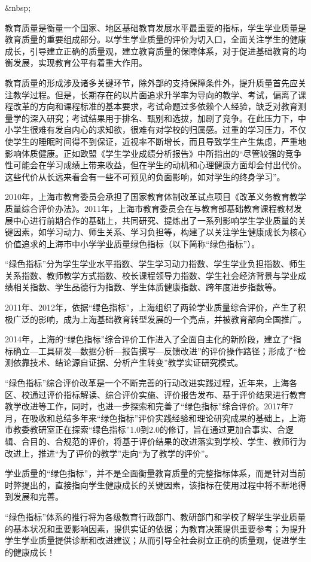 &nbsp;
\vspace{5mm}
\vspace{5mm}

\myprefacetext

教育质量是衡量一个国家、地区基础教育发展水平最重要的指标，学生学业质量是教育质量的重要组成部分。以学生学业质量的评价为切入口，全面关注学生的健康成长，引导建立正确的质量观，建立教育质量的保障体系，对于促进基础教育的均衡发展，实现教育公平有着重大作用。

教育质量的形成涉及诸多关键环节，除外部的支持保障条件外，提升质量首先应关注教学过程。但是，长期存在的以片面追求升学率为导向的教学、考试，偏离了课程改革的方向和课程标准的基本要求，考试命题过多依赖个人经验，缺乏对教育测量学的深入研究；考试结果用于排名、甄别和选拔，加剧了竞争。在此压力下，中小学生很难有发自内心的求知欲，很难有对学校的归属感。过重的学习压力，不仅使学生的睡眠时间得不到保证，近视率不断增长，而且导致学生产生焦虑，严重地影响体质健康。正如欧盟《学生学业成绩分析报告》中所指出的“尽管较强的竞争性可能会在学习成绩上带来收益，但在学生的动机和心理健康方面却会付出代价。这些代价从长远来看会有一些不可预见的负面影响，如对学生的终身学习”。

2010年，上海市教育委员会承担了国家教育体制改革试点项目《改革义务教育教学质量综合评价办法》。2011年，上海市教育委员会在与教育部基础教育课程教材发展中心进行前期合作的基础上，共同研究、提炼出了一系列影响学生学业质量的关键因素，如学习动力、师生关系、学习负担等，构建了以关注学生健康成长为核心价值追求的上海市中小学学业质量绿色指标（以下简称“绿色指标”）。


“绿色指标”分为学生学业水平指数、学生学习动力指数、学生学业负担指数、师生关系指数、教师教学方式指数、校长课程领导力指数、学生社会经济背景与学业成绩相关指数、学生品德行为指数、学生体质健康指数、跨年度进步指数等。


2011年、2012年，依据“绿色指标”，上海组织了两轮学业质量综合评价，产生了积极广泛的影响，成为上海基础教育转型发展的一个亮点，并被教育部向全国推广。


2014年，上海的“绿色指标”综合评价工作进入了全面自主化的新阶段，建立了“指标确立—工具研发—数据分析—报告撰写—反馈改进”的评价操作路径；形成了“检测依靠技术、结论源自证据、分析产生转变”教学实证研究模式。


“绿色指标”综合评价改革是一个不断完善的行动改进实践过程，近年来，上海各区、校通过评价指标解读、综合评价实施、评价报告发布、基于评价结果进行教育教学改进等工作，同时，也进一步探索和完善了“绿色指标”综合评价。2017年7月，在吸收和总结多年来“绿色指标”评价实践经验和理论研究成果的基础上，上海市教委教研室正在探索“绿色指标”1.0到2.0的修订，旨在通过更加合事实、合逻辑、合目的、合规范的评价，将基于评价结果的改进落实到学校、学生、教师行为改进上，推进“为了评价的教学”走向“为了教学的评价”。


学业质量的“绿色指标”，并不是全面衡量教育质量的完整指标体系，而是针对当前时弊提出的，直接指向学生健康成长的关键因素，该指标在使用过程中将不断地得到发展和完善。


“绿色指标”体系的推行将为各级教育行政部门、教研部门和学校了解学生学业质量的基本状况和重要影响因素，提供实证的依据；为教育决策提供重要参考；为提升学生学业质量提供诊断和改进建议；从而引导全社会树立正确的质量观，促进学生的健康成长！

\clearpage
